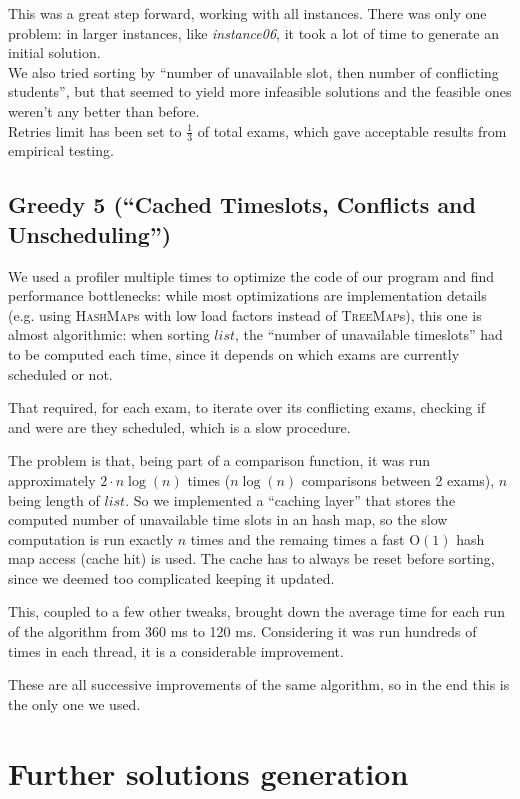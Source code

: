 \documentclass[11pt, a4paper, leqno]{article}
\begin{document}
	This was a great step forward, working with all instances. There was only one problem: in larger instances, like \textit{instance06}, it took a lot of time to generate an initial solution.\\
	We also tried sorting by ``number of unavailable slot, then number of conflicting students'', but that seemed to yield more infeasible solutions and the feasible ones weren't any better than before.\\
	Retries limit has been set to $\frac{1}{3}$ of total exams, which gave acceptable results from empirical testing.
	
	\subsection{Greedy 5 (``Cached Timeslots, Conflicts and Unscheduling'')}
	
	We used a profiler multiple times to optimize the code of our program and find performance bottlenecks: while most optimizations are implementation details (e.g. using \textsc{HashMap}s with low load factors instead of \textsc{TreeMap}s), this one is almost algorithmic: when sorting $list$, the ``number of unavailable timeslots'' had to be computed each time, since it depends on which exams are currently scheduled or not.
	
	That required, for each exam, to iterate over its conflicting exams, checking if and were are they scheduled, which is a slow procedure.
	
	The problem is that, being part of a comparison function, it was run approximately $2\cdot n \log(n)$ times ($n \log(n)$ comparisons between 2 exams), $n$ being length of $list$. So we implemented a ``caching layer'' that stores the computed number of unavailable time slots in an hash map, so the slow computation is run exactly $n$ times and the remaing times a fast $\mathrm{O}(1)$ hash map access (cache hit) is used. The cache has to always be reset before sorting, since we deemed too complicated keeping it updated.
	
	This, coupled to a few other tweaks, brought down the average time for each run of the algorithm from 360 ms to 120 ms. Considering it was run hundreds of times in each thread, it is a considerable improvement.
	
	These are all successive improvements of the same algorithm, so in the end this is the only one we used.
	
	\section{Further solutions generation}
	
\end{document}
